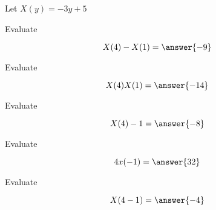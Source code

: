 \documentclass{ximera}
\author{Lee Wayand}
\begin{document}
\begin{exercise}





Let $X(y) = -3y + 5$ \\







\begin{question}


Evaluate  

\[
X(4)-X(1) = \answer{-9}
\]


\end{question}








\begin{question}


Evaluate  

\[
X(4)X(1) = \answer{-14}
\]


\end{question}









\begin{question}


Evaluate  

\[
X(4)-1 = \answer{-8}
\]


\end{question}








\begin{question}


Evaluate  

\[
4 x(-1) = \answer{32}
\]


\end{question}










\begin{question}


Evaluate  

\[
X(4-1) = \answer{-4}
\]


\end{question}








\end{exercise}
\end{document}
